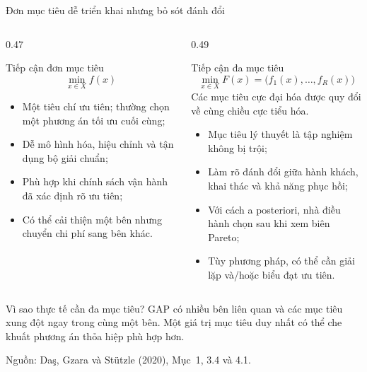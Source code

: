 \documentclass[aspectratio=169,10pt]{beamer}
\begin{document}
\begin{frame}[t]{Đơn mục tiêu dễ triển khai nhưng bỏ sót đánh đổi}

\footnotesize
\begin{columns}[T,onlytextwidth]
\begin{column}{0.47\textwidth}
\begin{block}{Tiếp cận đơn mục tiêu}
\[
    \min_{x\in X} f(x)
\]
\begin{itemize}
    \setlength{\itemsep}{1pt}
    \item Một tiêu chí ưu tiên; thường chọn một phương án tối ưu cuối cùng;
    \item Dễ mô hình hóa, hiệu chỉnh và tận dụng bộ giải chuẩn;
    \item Phù hợp khi chính sách vận hành đã xác định rõ ưu tiên;
    \item Có thể cải thiện một bên nhưng chuyển chi phí sang bên khác.
\end{itemize}
\end{block}
\end{column}

\begin{column}{0.49\textwidth}
\begin{alertblock}{Tiếp cận đa mục tiêu}
\[
    \min_{x\in X}F(x)=\bigl(f_1(x),\ldots,f_R(x)\bigr)
\]
{\scriptsize Các mục tiêu cực đại hóa được quy đổi về cùng chiều cực tiểu hóa.}
\begin{itemize}
    \setlength{\itemsep}{1pt}
    \item Mục tiêu lý thuyết là tập nghiệm không bị trội;
    \item Làm rõ đánh đổi giữa hành khách, khai thác và khả năng phục hồi;
    \item Với cách a posteriori, nhà điều hành chọn sau khi xem biên Pareto;
    \item Tùy phương pháp, có thể cần giải lặp và/hoặc biểu đạt ưu tiên.
\end{itemize}
\end{alertblock}
\end{column}
\end{columns}

\vspace{-0.6ex}
\begin{exampleblock}{Vì sao thực tế cần đa mục tiêu?}
GAP có nhiều bên liên quan và các mục tiêu xung đột ngay trong cùng một bên.
Một giá trị mục tiêu duy nhất có thể che khuất phương án thỏa hiệp phù hợp hơn.
\end{exampleblock}

\vspace{-0.7ex}
\vfill
\tiny Nguồn: Da\c{s}, Gzara và St\"utzle (2020), Mục~1, 3.4 và 4.1.
\end{frame}
\end{document}
